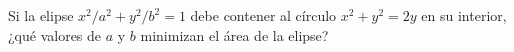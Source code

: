 \item Si la elipse $x^2/a^2 + y^2/b^2 = 1$ debe contener al círculo $x^2 + y^2 = 2y$ en su interior, ¿qué valores de $a$ y $b$ minimizan el área de la elipse?
